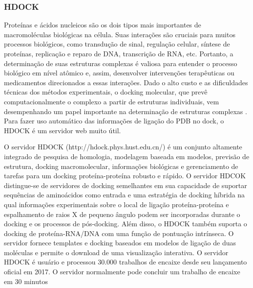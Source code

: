 \documentclass[11pt, letterpaper, portuguese]{article}
\begin{document}
\subsubsection{HDOCK}
		\par {Proteínas e ácidos nucleicos são os dois tipos mais importantes de macromoléculas biológicas na célula. Suas interações são cruciais para muitos processos biológicos, como transdução de sinal, regulação celular, síntese de proteínas, replicação e reparo de DNA, transcrição de RNA, etc. Portanto, a determinação de suas estruturas complexas é valiosa para entender o processo biológico em nível atômico e, assim, desenvolver intervenções terapêuticas ou medicamentos direcionados a essas interações. Dado o alto custo e as dificuldades técnicas dos métodos experimentais, o docking molecular, que prevê computacionalmente o complexo a partir de estruturas individuais, vem desempenhando um papel importante na determinação de estruturas complexas \cite{Yan_2017}. Para fazer uso automático das informações de ligação do PDB no dock, o HDOCK é um servidor web muito útil.}
		
   \par {O servidor HDOCK (http://hdock.phys.hust.edu.cn/) é um conjunto altamente integrado de pesquisa de homologia, modelagem baseada em modelos, previsão de estrutura, docking macromolecular, informações biológicas e gerenciamento de tarefas para um docking proteína-proteína robusto e rápido. O servidor HDCOK distingue-se de servidores de docking semelhantes em sua capacidade de suportar sequências de aminoácidos como entrada e uma estratégia de docking híbrida na qual informações experimentais sobre o local de ligação proteína-proteína e espalhamento de raios X de pequeno ângulo podem ser incorporadas durante o docking e os processos de pós-docking. Além disso, o HDOCK também suporta o docking de proteína-RNA/DNA com uma função de pontuação intrínseca. O servidor fornece templates e docking baseados em modelos de ligação de duas moléculas e permite o download de uma visualização interativa. O servidor HDOCK é usuário e processou 30.000 trabalhos de encaixe desde seu lançamento oficial em 2017. O servidor normalmente pode concluir um trabalho de encaixe em 30 minutos \cite{Yan_2020}}
\end{document}
